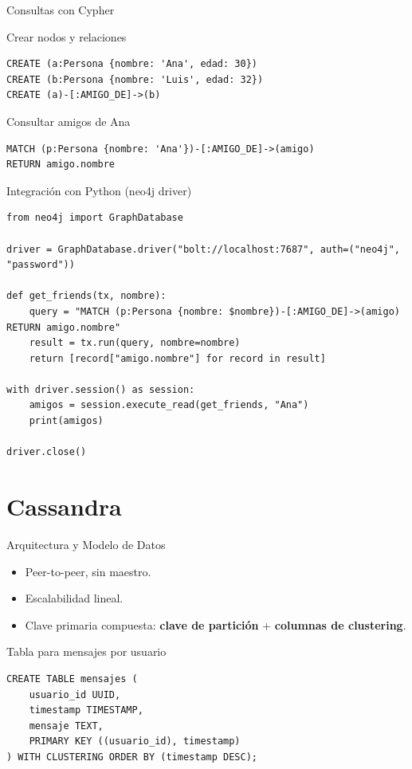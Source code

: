 \documentclass[aspectratio=169, 10pt, xcolor=table]{beamer}
\begin{document}
\begin{frame}[fragile]{Consultas con Cypher}
    \begin{block}{Crear nodos y relaciones}
        \begin{lstlisting}
CREATE (a:Persona {nombre: 'Ana', edad: 30})
CREATE (b:Persona {nombre: 'Luis', edad: 32})
CREATE (a)-[:AMIGO_DE]->(b)
        \end{lstlisting}
    \end{block}
    \begin{block}{Consultar amigos de Ana}
        \begin{lstlisting}
MATCH (p:Persona {nombre: 'Ana'})-[:AMIGO_DE]->(amigo)
RETURN amigo.nombre
        \end{lstlisting}
    \end{block}
\end{frame}

\begin{frame}[fragile]{Integración con Python (neo4j driver)}
    \begin{lstlisting}[style=python]
from neo4j import GraphDatabase

driver = GraphDatabase.driver("bolt://localhost:7687", auth=("neo4j", "password"))

def get_friends(tx, nombre):
    query = "MATCH (p:Persona {nombre: $nombre})-[:AMIGO_DE]->(amigo) RETURN amigo.nombre"
    result = tx.run(query, nombre=nombre)
    return [record["amigo.nombre"] for record in result]

with driver.session() as session:
    amigos = session.execute_read(get_friends, "Ana")
    print(amigos)

driver.close()
    \end{lstlisting}
\end{frame}

\section{Cassandra}

\begin{frame}[fragile]{Arquitectura y Modelo de Datos}
    \begin{itemize}
        \item Peer-to-peer, sin maestro.
        \item Escalabilidad lineal.
        \item Clave primaria compuesta: \textbf{clave de partición} + \textbf{columnas de clustering}.
    \end{itemize}
    \begin{exampleblock}{Tabla para mensajes por usuario}
        \begin{lstlisting}
CREATE TABLE mensajes (
    usuario_id UUID,
    timestamp TIMESTAMP,
    mensaje TEXT,
    PRIMARY KEY ((usuario_id), timestamp)
) WITH CLUSTERING ORDER BY (timestamp DESC);
        \end{lstlisting}
    \end{exampleblock}
\end{frame}
\end{document}
